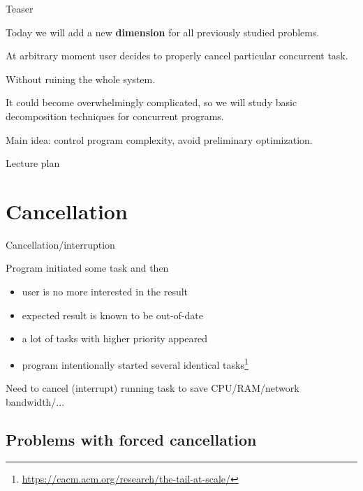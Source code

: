 \begin{frame}[t]{Teaser}

Today we will add a new \textbf{dimension} for all previously studied problems. 

\pause

At arbitrary moment user decides to properly cancel particular concurrent task.

\pause

Without ruining the whole system.

\pause

It could become overwhelmingly complicated, so we will study basic decomposition techniques for concurrent programs.

\pause

Main idea: control program complexity, avoid preliminary optimization.

\end{frame}

\begin{frame}{Lecture plan}
\tableofcontents
\end{frame}

\section{Cancellation}

\begin{frame}{Cancellation/interruption}

Program initiated some task and then
\begin{itemize}
    \item user is no more interested in the result
    \item expected result is known to be out-of-date
    \item a lot of tasks with higher priority appeared
    \item program intentionally started several identical tasks\footnote{\tiny\url{https://cacm.acm.org/research/the-tail-at-scale/}}
\end{itemize}

\pause

Need to cancel (interrupt) running task to save CPU/RAM/network bandwidth/...
\end{frame}



\subsection{Problems with forced cancellation}

